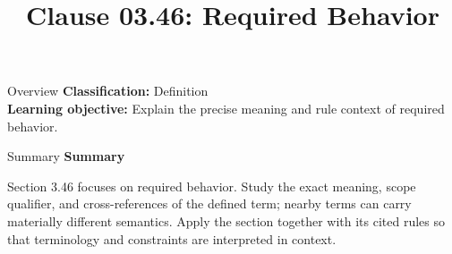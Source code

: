 \documentclass[10pt,letterpaper]{article}
\title{Clause 03.46: Required Behavior}
\author{}
\date{}
\begin{document}
\maketitle
\begin{CornellOverviewBox}{Overview}
\textbf{Classification:} Definition\\[2pt]
\textbf{Learning objective:} Explain the precise meaning and rule context of required behavior.
\end{CornellOverviewBox}\begin{CornellSummaryBox}{Summary}
{\sffamily\bfseries\color{Accent} Summary}\par\vspace{3pt}Section 3.46 focuses on required behavior. Study the exact meaning, scope qualifier, and cross-references of the defined term; nearby terms can carry materially different semantics. Apply the section together with its cited rules so that terminology and constraints are interpreted in context.
\end{CornellSummaryBox}
\end{document}
